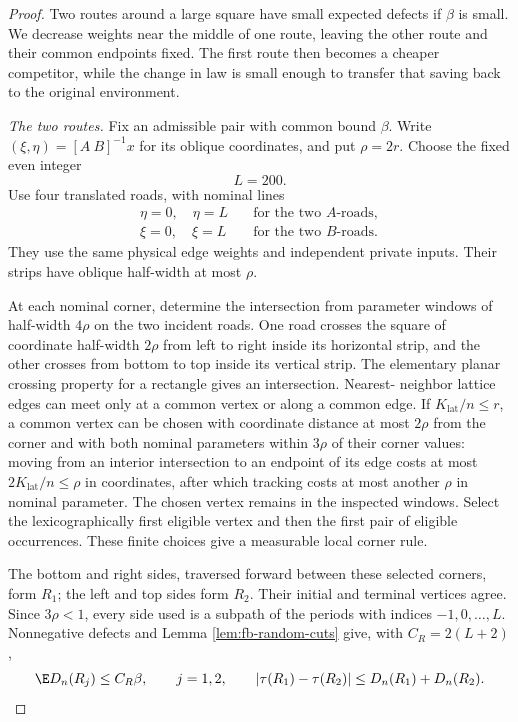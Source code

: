 \begin{proof}
Two routes around a large square have small expected defects if
$\beta$ is small.  We decrease weights near the middle of one route,
leaving the other route and their common endpoints fixed.  The first
route then becomes a cheaper competitor, while the change in law is
small enough to transfer that saving back to the original environment.

\emph{The two routes.}
Fix an admissible pair with common bound $\beta$.  Write
$(\xi,\eta)=[A\ B]^{-1}x$ for its oblique coordinates, and put
$\rho=2r$.  Choose the fixed even integer
\[
 L=200.
\]
Use four translated roads, with nominal lines
\[
 \begin{aligned}
 \eta=0,\quad\eta=L
 &\quad\text{for the two $A$-roads},\\
 \xi=0,\quad\xi=L
 &\quad\text{for the two $B$-roads}.
 \end{aligned}
\]
They use the same physical edge weights and independent private
inputs.  Their strips have oblique half-width at most $\rho$.

At each nominal corner, determine the intersection from parameter
windows of half-width $4\rho$ on the two incident roads.  One
road crosses the square of coordinate half-width $2\rho$ from left
to right inside its horizontal strip, and the other crosses from
bottom to top inside its vertical strip.  The elementary planar
crossing property for a rectangle gives an intersection.  Nearest-
neighbor lattice edges can meet only at a common vertex or along a
common edge.  If $K_{\mathrm{lat}}/n\le r$, a common vertex can be chosen with
coordinate distance at most $2\rho$ from the corner and with both
nominal parameters within $3\rho$ of their corner values: moving
from an interior intersection to an endpoint of its edge costs at
most $2K_{\mathrm{lat}}/n\le\rho$ in coordinates, after which tracking costs at
most another $\rho$ in nominal parameter.  The chosen vertex remains
in the inspected windows.  Select the lexicographically first eligible vertex
and then the first pair of eligible occurrences.  These finite choices
give a measurable local corner rule.

The bottom and right sides, traversed forward between these selected
corners, form $R_1$; the left and top sides form $R_2$.  Their initial
and terminal vertices agree.  Since $3\rho<1$, every side used is a
subpath of the periods with indices $-1,0,\ldots,L$.  Nonnegative
defects and Lemma \ref{lem:fb-random-cuts} give, with
$C_R=2(L+2)$,
\begin{equation}
 \E D_n(R_j)\le C_R\beta,\qquad j=1,2,
 \qquad
 |\tau(R_1)-\tau(R_2)|\le D_n(R_1)+D_n(R_2).
 \label{eq:fb-route-defects}
\end{equation}


\end{proof}
